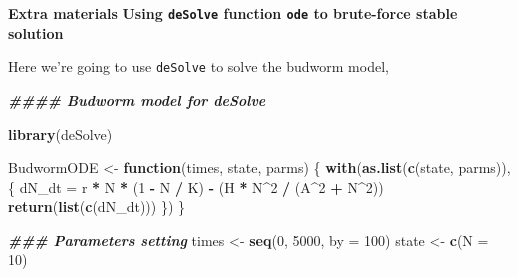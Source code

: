 \documentclass[
]{book}
\newenvironment{Shaded}{\begin{snugshade}}{\end{snugshade}}
\newcommand{\AttributeTok}[1]{\textcolor[rgb]{0.13,0.29,0.53}{#1}}
\newcommand{\ControlFlowTok}[1]{\textcolor[rgb]{0.13,0.29,0.53}{\textbf{#1}}}
\newcommand{\DecValTok}[1]{\textcolor[rgb]{0.00,0.00,0.81}{#1}}
\newcommand{\DocumentationTok}[1]{\textcolor[rgb]{0.56,0.35,0.01}{\textbf{\textit{#1}}}}
\newcommand{\FunctionTok}[1]{\textcolor[rgb]{0.13,0.29,0.53}{\textbf{#1}}}
\newcommand{\NormalTok}[1]{#1}
\newcommand{\OtherTok}[1]{\textcolor[rgb]{0.56,0.35,0.01}{#1}}
\newcommand{\SpecialCharTok}[1]{\textcolor[rgb]{0.81,0.36,0.00}{\textbf{#1}}}
\begin{document}
\textbf{Extra materials}
\textbf{Using \texttt{deSolve} function \texttt{ode} to brute-force stable solution}

Here we're going to use \texttt{deSolve} to solve the budworm model,

\begin{Shaded}
\begin{Highlighting}[]
\DocumentationTok{\#\#\#\# Budworm model for deSolve}

\FunctionTok{library}\NormalTok{(deSolve)}

\NormalTok{BudwormODE }\OtherTok{\textless{}{-}} \ControlFlowTok{function}\NormalTok{(times, state, parms) \{}
  \FunctionTok{with}\NormalTok{(}\FunctionTok{as.list}\NormalTok{(}\FunctionTok{c}\NormalTok{(state, parms)), \{}
\NormalTok{    dN\_dt }\OtherTok{=}\NormalTok{ r }\SpecialCharTok{*}\NormalTok{ N }\SpecialCharTok{*}\NormalTok{ (}\DecValTok{1} \SpecialCharTok{{-}}\NormalTok{ N }\SpecialCharTok{/}\NormalTok{ K) }\SpecialCharTok{{-}}\NormalTok{ (H }\SpecialCharTok{*}\NormalTok{ N}\SpecialCharTok{\^{}}\DecValTok{2} \SpecialCharTok{/}\NormalTok{ (A}\SpecialCharTok{\^{}}\DecValTok{2} \SpecialCharTok{+}\NormalTok{ N}\SpecialCharTok{\^{}}\DecValTok{2}\NormalTok{))}
    \FunctionTok{return}\NormalTok{(}\FunctionTok{list}\NormalTok{(}\FunctionTok{c}\NormalTok{(dN\_dt)))}
\NormalTok{  \})}
\NormalTok{\}}

\DocumentationTok{\#\#\# Parameters setting}
\NormalTok{times }\OtherTok{\textless{}{-}} \FunctionTok{seq}\NormalTok{(}\DecValTok{0}\NormalTok{, }\DecValTok{5000}\NormalTok{, }\AttributeTok{by =} \DecValTok{100}\NormalTok{)}
\NormalTok{state }\OtherTok{\textless{}{-}} \FunctionTok{c}\NormalTok{(}\AttributeTok{N =} \DecValTok{10}\NormalTok{)}


\end{Highlighting}
\end{Shaded}
\end{document}
